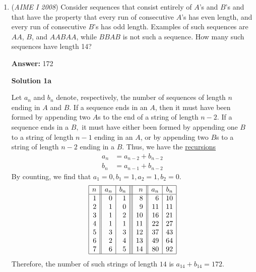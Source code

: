\begin{enumerate}
 How do you assume $\overline{AD}$ $= 40\sqrt{7}$.

 
(how is this a P10 what)

 \href{https://mathproblemsolvingskills.wordpress.com/}{MathProblemSolvingSkills.com}

 


 


	\item (\textit{AIME I 2008}) Consider sequences that consist entirely of $A$'s and $B$'s and that have the property that every run of consecutive $A$'s has even length, and every run of consecutive $B$'s has odd length. Examples of such sequences are $AA$, $B$, and $AABAA$, while $BBAB$ is not such a sequence. How many such sequences have length 14?


 
 \textbf{Answer: }172



\textbf{Solution 1a}

Let $a_n$ and $b_n$ denote, respectively, the number of sequences of length $n$ ending in $A$ and $B$. If a sequence ends in an $A$, then it must have been formed by appending two $A$s to the end of a string of length $n-2$. If a sequence ends in a $B,$ it must have either been formed by appending one $B$ to a string of length $n-1$ ending in an $A$, or by appending two $B$s to a string of length $n-2$ ending in a $B$. Thus, we have the \href{https://artofproblemsolving.com/wiki/index.php?title=Recursion}{recursions}
 \begin{align*} a_n &= a_{n-2} + b_{n-2}\\ b_n &= a_{n-1} + b_{n-2}  \end{align*}
By counting, we find that $a_1 = 0, b_1 = 1, a_2 = 1, b_2 = 0$. 
 \[\begin{array}{|r||r|r|||r||r|r|} \hline n & a_n & b_n & n & a_n & b_n\\ \hline 1&0&1& 8&6&10\\ 2&1&0& 9&11&11\\ 3&1&2& 10&16&21\\ 4&1&1& 11&22&27\\ 5&3&3& 12&37&43\\ 6&2&4& 13&49&64\\ 7&6&5& 14&80&92\\ \hline \end{array}\]Therefore, the number of such strings of length $14$ is $a_{14} + b_{14} = \boxed{172}$.


\end{enumerate}
